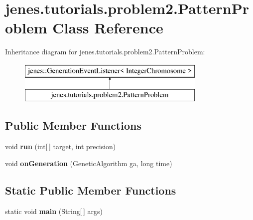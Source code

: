 \hypertarget{classjenes_1_1tutorials_1_1problem2_1_1_pattern_problem}{\section{jenes.\-tutorials.\-problem2.\-Pattern\-Problem Class Reference}
\label{classjenes_1_1tutorials_1_1problem2_1_1_pattern_problem}
}
Inheritance diagram for jenes.\-tutorials.\-problem2.\-Pattern\-Problem\-:\begin{figure}[H]
\begin{center}
\leavevmode
\includegraphics[height=2.000000cm]{classjenes_1_1tutorials_1_1problem2_1_1_pattern_problem}
\end{center}
\end{figure}
\subsection*{Public Member Functions}
\begin{DoxyCompactItemize}
\item 
\hypertarget{classjenes_1_1tutorials_1_1problem2_1_1_pattern_problem_ae9d7568d540e52512e2e6ce589c624bd}{void {\bfseries run} (int\mbox{[}$\,$\mbox{]} target, int precision)}\label{classjenes_1_1tutorials_1_1problem2_1_1_pattern_problem_ae9d7568d540e52512e2e6ce589c624bd}

\item 
\hypertarget{classjenes_1_1tutorials_1_1problem2_1_1_pattern_problem_a32a0d783caa7bc42a8bb8b96ce0e4fe2}{void {\bfseries on\-Generation} (Genetic\-Algorithm ga, long time)}\label{classjenes_1_1tutorials_1_1problem2_1_1_pattern_problem_a32a0d783caa7bc42a8bb8b96ce0e4fe2}

\end{DoxyCompactItemize}
\subsection*{Static Public Member Functions}
\begin{DoxyCompactItemize}
\item 
\hypertarget{classjenes_1_1tutorials_1_1problem2_1_1_pattern_problem_a194be818fd81bffd0167012016a7035c}{static void {\bfseries main} (String\mbox{[}$\,$\mbox{]} args)}\label{classjenes_1_1tutorials_1_1problem2_1_1_pattern_problem_a194be818fd81bffd0167012016a7035c}

\end{DoxyCompactItemize}


